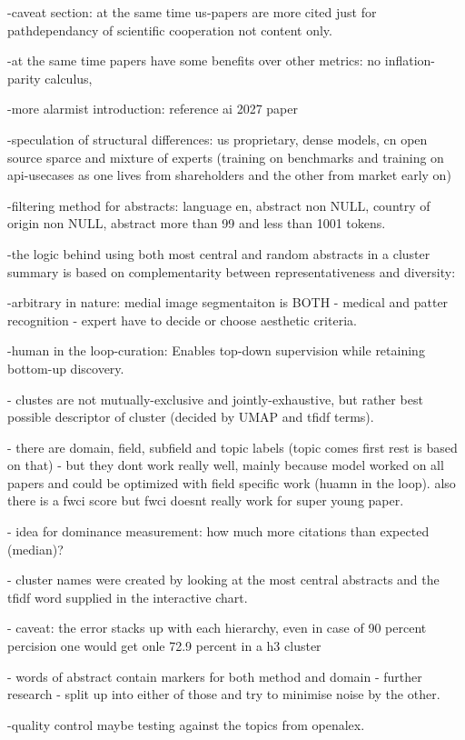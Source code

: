 \documentclass{article}
\begin{document}
-caveat section: at the same time us-papers are more cited just for pathdependancy of scientific cooperation not content only.

-at the same time papers have some benefits over other metrics: no inflation-parity calculus, 

-more alarmist introduction: reference ai 2027 paper

-speculation of structural differences: us proprietary, dense models, cn open source sparce and mixture of experts (training on benchmarks and training on api-usecases as one lives from shareholders and the other from market early on)

-filtering method for abstracts: language en, abstract non NULL, country of origin non NULL, abstract more than 99 and less than 1001 tokens.

-the logic behind using both most central and random abstracts in a cluster summary is based on complementarity between representativeness and diversity:

-arbitrary in nature: medial image segmentaiton is BOTH - medical and patter recognition - expert have to decide or choose aesthetic criteria.

-human in the loop-curation: Enables top-down supervision while retaining bottom-up discovery.

- clustes are not mutually-exclusive and jointly-exhaustive, but rather best possible descriptor of cluster (decided by UMAP and tfidf terms). 

- there are domain, field, subfield and topic labels (topic comes first rest is based on that) - but they dont work really well, mainly because model worked on all papers and could be optimized with field specific work (huamn in the loop). also there is a fwci score but fwci doesnt really work for super young paper.

- idea for dominance measurement: how much more citations than expected (median)?

- cluster names were created by looking at the most central abstracts and the tfidf word supplied in the interactive chart.

- caveat: the error stacks up with each hierarchy, even in case of 90 percent percision one would get onle 72.9 percent in a h3 cluster

- words of abstract contain markers for both method and domain - further research - split up into either of those and try to minimise noise by the other.

-quality control maybe testing against the topics from openalex.
\end{document}
